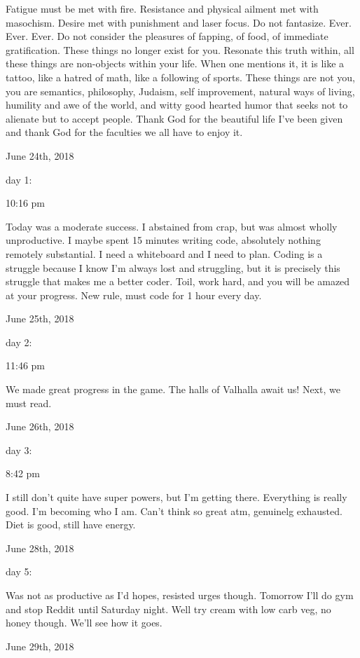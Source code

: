 Fatigue must be met with fire. Resistance and physical ailment met with
masochism. Desire met with punishment and laser focus. Do not fantasize.
Ever. Ever. Ever. Do not consider the pleasures of fapping, of food, of
immediate gratification. These things no longer exist for you. Resonate
this truth within, all these things are non-objects within your life.
When one mentions it, it is like a tattoo, like a hatred of math, like a
following of sports. These things are not you, you are semantics,
philosophy, Judaism, self improvement, natural ways of living, humility
and awe of the world, and witty good hearted humor that seeks not to
alienate but to accept people. Thank God for the beautiful life I've
been given and thank God for the faculties we all have to enjoy it.

\bigskip
\bigskip
June 24th, 2018

day 1:

10:16 pm

Today was a moderate success. I abstained from crap, but was almost
wholly unproductive. I maybe spent 15 minutes writing code, absolutely
nothing remotely substantial. I need a whiteboard and I need to plan.
Coding is a struggle because I know I'm always lost and struggling, but
it is precisely this struggle that makes me a better coder. Toil, work
hard, and you will be amazed at your progress. New rule, must code for 1
hour every day.

\bigskip
\bigskip
June 25th, 2018

day 2:

11:46 pm

We made great progress in the game. The halls of Valhalla await us!
Next, we must read.

\bigskip
\bigskip
June 26th, 2018

day 3:

8:42 pm

I still don't quite have super powers, but I'm getting there. Everything
is really good. I'm becoming who I am. Can't think so great atm,
genuinelg exhausted. Diet is good, still have energy.

\bigskip
\bigskip
June 28th, 2018

day 5:

Was not as productive as I'd hopes, resisted urges though. Tomorrow I'll
do gym and stop Reddit until Saturday night. Well try cream with low
carb veg, no honey though. We'll see how it goes.

\bigskip
\bigskip
June 29th, 2018

